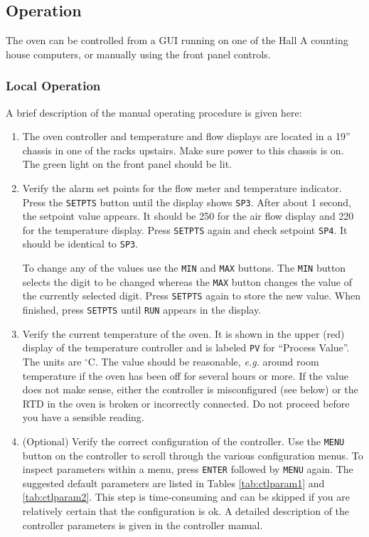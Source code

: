 \subsection{Operation}
The oven can be controlled from a GUI running
on one of the Hall A counting house computers, or manually using the
front panel controls. 

\subsubsection{Local Operation}
A brief description of the manual operating procedure is given here:

\begin{enumerate}
\item The oven controller and temperature and flow displays are located
  in a 19'' chassis in one of the racks upstairs. Make sure power to this
  chassis is on. The green light on the front panel should be lit.

\item Verify the alarm set points for the flow meter and
  temperature indicator. Press the {\tt SETPTS} button
  until the display shows {\tt SP3}. After about 1 second,
  the setpoint value appears. It should be 250 for the
  air flow display and 220 for the temperature display. Press
  {\tt SETPTS} again and check setpoint {\tt SP4}. It
  should be identical to {\tt SP3}.

  To change
  any of the values use the {\tt MIN} and {\tt MAX} buttons. The {\tt MIN}
  button selects the digit to be changed whereas the {\tt MAX}
  button changes the value of the currently selected digit.
  Press {\tt SETPTS} again to store the new value. 
  When finished, press {\tt SETPTS} until {\tt RUN} appears in the
  display.


\item Verify the current temperature of the oven. It is shown
  in the upper (red) display of the temperature controller
  and is labeled {\tt PV} for ``Process Value''. The units are $^\circ$C.
  The value should be reasonable,
  {\it e.g.}\/ around room temperature if the oven has been off
  for several hours or more. If the value does not make sense,
  either the controller is misconfigured (see below) or the RTD 
  in the oven is broken or incorrectly connected. 
  Do not proceed before you have a sensible reading.

\item (Optional) Verify the correct configuration of the controller.
  Use the {\tt MENU} button on the controller to scroll through
  the various configuration menus. To inspect parameters within
  a menu, press {\tt ENTER} followed by {\tt MENU} again. The suggested
  default parameters are listed in Tables \ref{tab:ctlparam1}
  and \ref{tab:ctlparam2}. This step
  is time-consuming and can be skipped if you are relatively certain
  that the configuration is ok. A detailed description of the 
  controller parameters is given in the controller manual.


\end{enumerate}
